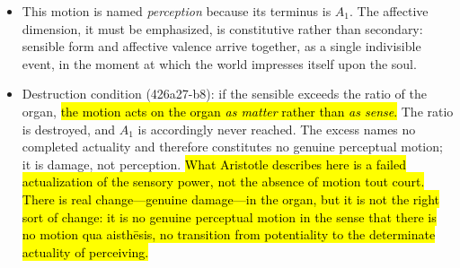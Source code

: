 \begin{itemize}
\begin{itemize}
\begin{itemize}
\begin{itemize}
            \end{itemize}
        \item This motion is named \textit{perception} because its terminus is $A_1$. The affective dimension, it must be emphasized, is constitutive rather than secondary: sensible form and affective valence arrive together, as a single indivisible event, in the moment at which the world impresses itself upon the soul.
        \item Destruction condition (426a27-b8): if the sensible exceeds the ratio of the organ, \hl{the motion acts on the organ \textit{as matter} rather than \textit{as sense}.} The ratio is destroyed, and $A_1$ is accordingly never reached. The excess names no completed actuality and therefore constitutes no genuine perceptual motion; it is damage, not perception. \hl{What Aristotle describes here is a failed actualization of the sensory power, not the absence of motion tout court. There is real change---genuine damage---in the organ, but it is not the right sort of change: it is no genuine perceptual motion in the sense that there is no motion qua aisthēsis, no transition from potentiality to the determinate actuality of perceiving.}
        \end{itemize}
    \end{itemize}
\end{itemize}

